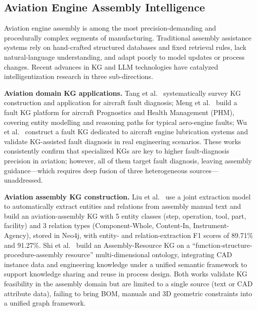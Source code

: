 \documentclass[applsci,article,submit,pdftex,moreauthors]{Definitions/mdpi}
\begin{document}
\subsection{Aviation Engine Assembly Intelligence}
\label{sec:related-aero}

Aviation engine assembly is among the most precision-demanding and procedurally complex segments of manufacturing. Traditional assembly assistance systems rely on hand-crafted structured databases and fixed retrieval rules, lack natural-language understanding, and adapt poorly to model updates or process changes. Recent advances in KG and LLM technologies have catalyzed intelligentization research in three sub-directions.

\textbf{Aviation domain KG applications.} Tang et al.~\citep{tang2023aircraft} systematically survey KG construction and application for aircraft fault diagnosis; Meng et al.~\citep{meng2024aircraft} build a fault KG platform for aircraft Prognostics and Health Management (PHM), covering entity modelling and reasoning paths for typical aero-engine faults; Wu et al.~\citep{wu2024engine} construct a fault KG dedicated to aircraft engine lubrication systems and validate KG-assisted fault diagnosis in real engineering scenarios. These works consistently confirm that specialized KGs are key to higher fault-diagnosis precision in aviation; however, all of them target fault diagnosis, leaving assembly guidance---which requires deep fusion of three heterogeneous sources---unaddressed.

\textbf{Aviation assembly KG construction.} Liu et al.~\citep{liu2023avkg} use a joint extraction model to automatically extract entities and relations from assembly manual text and build an aviation-assembly KG with 5 entity classes (step, operation, tool, part, facility) and 3 relation types (Component-Whole, Content-In, Instrument-Agency), stored in Neo4j, with entity- and relation-extraction F1 scores of 89.71\% and 91.27\%. Shi et al.~\citep{shi2022arkg} build an Assembly-Resource KG on a ``function-structure-procedure-assembly resource'' multi-dimensional ontology, integrating CAD instance data and engineering knowledge under a unified semantic framework to support knowledge sharing and reuse in process design. Both works validate KG feasibility in the assembly domain but are limited to a single source (text or CAD attribute data), failing to bring BOM, manuals and 3D geometric constraints into a unified graph framework.
\end{document}
